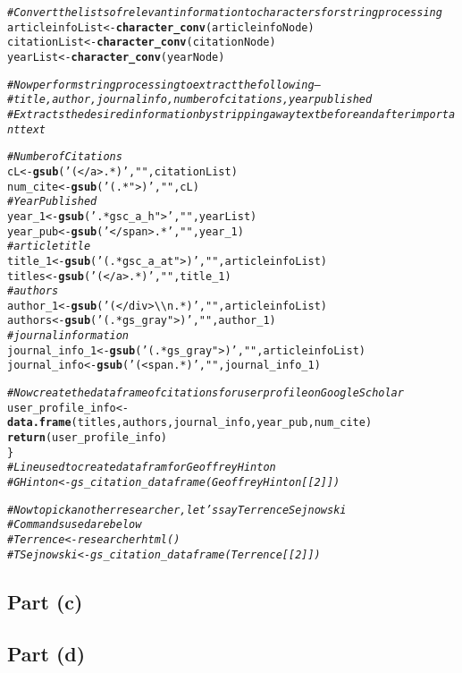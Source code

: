 \documentclass{article}\usepackage[]{graphicx}\usepackage[]{color}
\makeatletter
\newcommand{\hlstr}[1]{\textcolor[rgb]{0.192,0.494,0.8}{#1}}%
\newcommand{\hlcom}[1]{\textcolor[rgb]{0.678,0.584,0.686}{\textit{#1}}}%
\newcommand{\hlstd}[1]{\textcolor[rgb]{0.345,0.345,0.345}{#1}}%
\newcommand{\hlkwb}[1]{\textcolor[rgb]{0.69,0.353,0.396}{#1}}%
\newcommand{\hlkwd}[1]{\textcolor[rgb]{0.737,0.353,0.396}{\textbf{#1}}}%
\newenvironment{kframe}{%
 \def\at@end@of@kframe{}%
 \ifinner\ifhmode%
  \def\at@end@of@kframe{\end{minipage}}%
  \begin{minipage}{\columnwidth}%
 \fi\fi%
 \def\FrameCommand##1{\hskip\@totalleftmargin \hskip-\fboxsep
 \colorbox{shadecolor}{##1}\hskip-\fboxsep
     \hskip-\linewidth \hskip-\@totalleftmargin \hskip\columnwidth}%
 \MakeFramed {\advance\hsize-\width
   \@totalleftmargin\z@ \linewidth\hsize
   \@setminipage}}%
 {\par\unskip\endMakeFramed%
 \at@end@of@kframe}
\newenvironment{knitrout}{}{} %
\makeatother
\begin{document}
\begin{knitrout}
\begin{kframe}
\begin{alltt}
  \hlcom{#Convert the lists of relevant information to characters for string processing}
  \hlstd{articleinfoList}\hlkwb{<-}\hlkwd{character_conv}\hlstd{(articleinfoNode)}
  \hlstd{citationList}\hlkwb{<-}\hlkwd{character_conv}\hlstd{(citationNode)}
  \hlstd{yearList}\hlkwb{<-}\hlkwd{character_conv}\hlstd{(yearNode)}

  \hlcom{#Now perform string processing to extract the following--}
  \hlcom{#title, author, journal info, number of citations, year published}
  \hlcom{#Extracts the desired information by stripping away text before and after important text}

  \hlcom{#Number of Citations}
  \hlstd{cL}\hlkwb{<-}\hlkwd{gsub}\hlstd{(}\hlstr{'(</a>.*)'}\hlstd{,}\hlstr{""}\hlstd{,citationList)}
  \hlstd{num_cite}\hlkwb{<-}\hlkwd{gsub}\hlstd{(}\hlstr{'(.*">)'}\hlstd{,}\hlstr{""}\hlstd{,cL)}
  \hlcom{#Year Published}
  \hlstd{year_1}\hlkwb{<-}\hlkwd{gsub}\hlstd{(}\hlstr{'.*gsc_a_h">'}\hlstd{,}\hlstr{""}\hlstd{,yearList)}
  \hlstd{year_pub}\hlkwb{<-}\hlkwd{gsub}\hlstd{(}\hlstr{'</span>.*'}\hlstd{,}\hlstr{""}\hlstd{,year_1)}
  \hlcom{#article title}
  \hlstd{title_1}\hlkwb{<-}\hlkwd{gsub}\hlstd{(}\hlstr{'(.*gsc_a_at">)'}\hlstd{,}\hlstr{""}\hlstd{,articleinfoList)}
  \hlstd{titles}\hlkwb{<-}\hlkwd{gsub}\hlstd{(}\hlstr{'(</a>.*)'}\hlstd{,}\hlstr{""}\hlstd{,title_1)}
  \hlcom{#authors}
  \hlstd{author_1}\hlkwb{<-}\hlkwd{gsub}\hlstd{(}\hlstr{'(</div>\textbackslash{}\textbackslash{}n.*)'}\hlstd{,}\hlstr{""}\hlstd{,articleinfoList)}
  \hlstd{authors}\hlkwb{<-}\hlkwd{gsub}\hlstd{(}\hlstr{'(.*gs_gray">)'}\hlstd{,}\hlstr{""}\hlstd{,author_1)}
  \hlcom{#journal information}
  \hlstd{journal_info_1}\hlkwb{<-}\hlkwd{gsub}\hlstd{(}\hlstr{'(.*gs_gray">)'}\hlstd{,}\hlstr{""}\hlstd{,articleinfoList)}
  \hlstd{journal_info}\hlkwb{<-}\hlkwd{gsub}\hlstd{(}\hlstr{'(<span.*)'}\hlstd{,}\hlstr{""}\hlstd{,journal_info_1)}

  \hlcom{#Now create the dataframe of citations for user profile on Google Scholar}
  \hlstd{user_profile_info}\hlkwb{<-}\hlkwd{data.frame}\hlstd{(titles, authors, journal_info, year_pub, num_cite)}
  \hlkwd{return}\hlstd{(user_profile_info)}
\hlstd{\}}
\hlcom{#Line used to create data fram for Geoffrey Hinton}
\hlcom{#GHinton<-gs_citation_dataframe(GeoffreyHinton[[2]])}

\hlcom{#Now to pick another researcher, let's say Terrence Sejnowski}
\hlcom{#Commands used are below}
\hlcom{#Terrence<-researcherhtml()}
\hlcom{#TSejnowski<-gs_citation_dataframe(Terrence[[2]])}
\end{alltt}
\end{kframe}
\end{knitrout}
\subsection{Part (c)}
\subsection{Part (d)}
\end{document}
